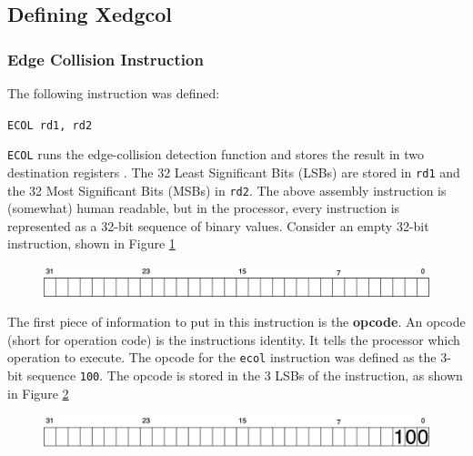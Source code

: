\subsection{Defining Xedgcol}

    \subsubsection{Edge Collision Instruction}
    The following instruction was defined:

    \begin{center}
    \texttt{ECOL rd1, rd2}
    \end{center}

    \texttt{ECOL} runs the edge-collision detection function and stores the result in two destination registers . The 32 Least Significant Bits (LSBs) are stored in \texttt{rd1} and the 32 Most Significant Bits (MSBs) in \texttt{rd2}. The above assembly instruction is (somewhat) human readable, but in the processor, every instruction is represented as a 32-bit sequence of binary values. Consider an empty 32-bit instruction, shown in Figure \ref{fig:instr_blank}

    \begin{figure}[H]
    \begin{center}
    \includegraphics[width=0.85\linewidth]{chapters/chapter4/img/instr_blank.png} 
    \label{fig:instr_blank}
    \end{center}
    \end{figure}

    The first piece of information to put in this instruction is the \textbf{opcode}. An opcode (short for operation code) is the instructions identity. It tells the processor which operation to execute. The opcode for the \texttt{ecol} instruction was defined as the 3-bit sequence \texttt{100}. The opcode is stored in the 3 \glspl{LSB} of the instruction, as shown in Figure \ref{fig:instr_op}

    \begin{figure}[H]
    \begin{center}
    \includegraphics[width=0.85\linewidth]{chapters/chapter4/img/instr_op.png} 
    \label{fig:instr_op}
    \end{center}
    \end{figure}

